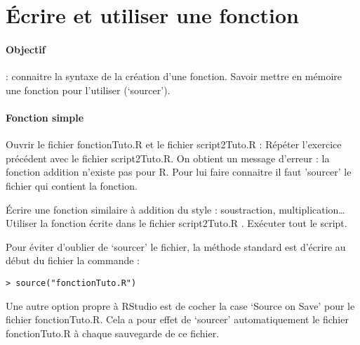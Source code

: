 \section{Écrire et utiliser une fonction}
\paragraph{Objectif }: connaitre la syntaxe de la création d'une fonction. Savoir mettre en mémoire une fonction pour l'utiliser (‘sourcer').
\paragraph{Fonction simple}
Ouvrir le fichier fonctionTuto.R et le fichier script2Tuto.R :
Répéter l'exercice précédent avec le fichier script2Tuto.R.
On obtient un message d'erreur :  la fonction addition n'existe pas pour R. Pour lui faire connaitre il faut 'sourcer' le fichier qui contient la fonction.
\par
Écrire une fonction similaire à addition du style : soustraction, multiplication…
Utiliser la fonction écrite dans le fichier script2Tuto.R .
Exécuter tout le script.
\par
Pour éviter d'oublier de ‘sourcer' le fichier, la méthode standard est d'écrire au début du fichier la commande  :
\begin{verbatim}
> source("fonctionTuto.R")
\end{verbatim}

Une autre option propre à RStudio est de cocher la case ‘Source on Save' pour le fichier fonctionTuto.R. Cela a pour effet de ‘sourcer' automatiquement le fichier fonctionTuto.R à chaque sauvegarde de ce fichier.



















